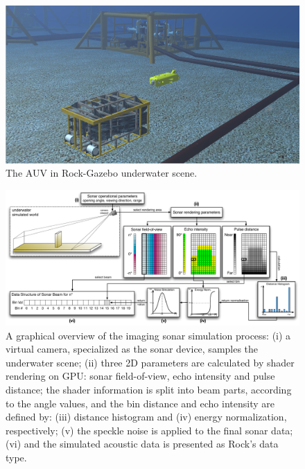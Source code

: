 \documentclass[final,5p,times]{elsarticle}
\begin{document}
\begin{figure}[t]
    \includegraphics[width=\columnwidth]{figs/uwscene}
    \centering
    \captionsetup{justification=justified}
    \caption{The AUV in Rock-Gazebo underwater scene.}
    \label{fig:uwscene}
\end{figure}


\begin{figure}[t]
    \includegraphics[width=0.85\paperwidth]{figs/sonar_sim}
    \centering
    \captionsetup{justification=justified}
    \caption{A graphical overview of the imaging sonar simulation process: (i) a virtual camera, specialized as the sonar device, samples the underwater scene; (ii) three 2D parameters are calculated by shader rendering on GPU: sonar field-of-view, echo intensity and pulse distance; the shader information is split into beam parts, according to the angle values, and the bin distance and echo intensity are defined by: (iii) distance histogram and (iv) energy normalization, respectively; (v) the speckle noise is applied to the final sonar data; (vi) and the simulated acoustic data is presented as Rock's data type.}
    \label{fig:sonar_sim}
\end{figure}
\end{document}
